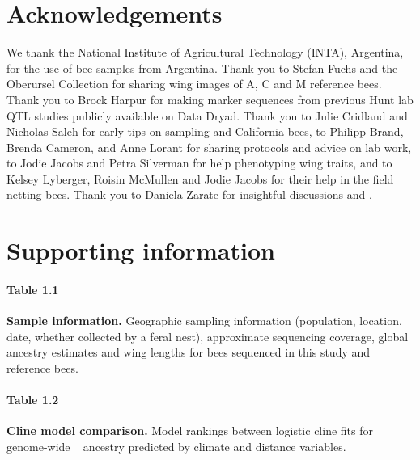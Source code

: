 \section*{Acknowledgements}
We thank the National Institute of Agricultural Technology (INTA), Argentina, for the use of bee samples from Argentina. Thank you to Stefan Fuchs and the Oberursel Collection for sharing wing images of A, C and M reference bees. Thank you to Brock Harpur for making marker sequences from previous Hunt lab QTL studies publicly available on Data Dryad. Thank you to Julie Cridland and Nicholas Saleh for early tips on sampling and California bees, to Philipp Brand, Brenda Cameron, and Anne Lorant for sharing protocols and advice on lab work, to Jodie Jacobs and Petra Silverman for help phenotyping wing traits, and to Kelsey Lyberger, Roisin McMullen and Jodie Jacobs for their help in the field netting bees.  Thank you to Daniela Zarate for insightful discussions and .


\medskip






\newpage
\section*{Supporting information}

\paragraph*{Table 1.1}
\label{table_bee_gps}
{\bf Sample information.} Geographic sampling information (population, location, date, whether collected by a feral nest), approximate sequencing coverage, global ancestry estimates and wing lengths for bees sequenced in this study and reference bees.

\paragraph*{Table 1.2}
\label{table_AIC_climate_clines}
{\bf Cline model comparison.} Model rankings between logistic cline fits for genome-wide \scutellata\  ancestry predicted by climate and distance variables.


